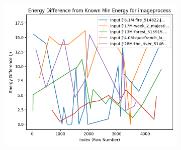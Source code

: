 \documentclass[times, 10pt,twocolumn]{article}
\begin{document}
\begin{figure}[ht]
\begin{subfigure}[b]{0.3\textwidth}
     \caption{}
     \label{fig:image_energy_diff}
   \end{subfigure}
   \hfill
   \begin{subfigure}[b]{0.3\textwidth}
      \includegraphics[width=\textwidth]{imgs/final_experiment_plots/model_analysis/measurement_data_analysis/image_compare_min.png}
     \caption{}
     \label{fig:image_compare_min}
   \end{subfigure}


\end{figure}
\end{document}
